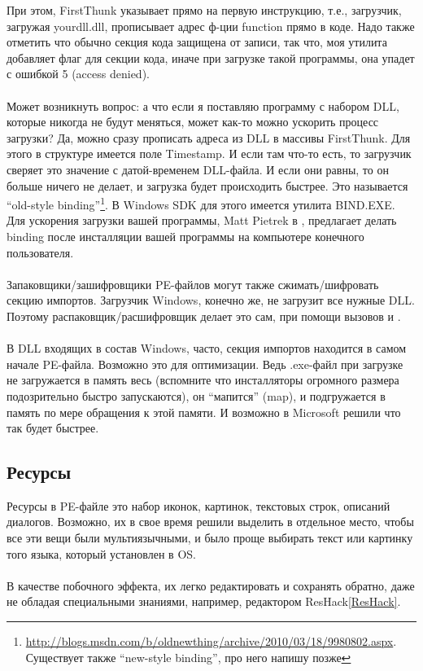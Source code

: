 При этом, FirstThunk указывает прямо на первую инструкцию, т.е., загрузчик, загружая yourdll.dll, прописывает адрес
ф-ции function прямо в коде. Надо также отметить что обычно секция кода защищена от записи, так что, моя утилита
добавляет флаг  для секции кода, иначе при загрузке такой программы, она упадет с
ошибкой 5 (access denied). \\
\\
Может возникнуть вопрос: а что если я поставляю программу с набором DLL, которые никогда не будут меняться,
может как-то можно ускорить процесс загрузки? Да, можно сразу прописать адреса из DLL в массивы FirstThunk.
Для этого в структуре  имеется поле Timestamp. И если там что-то есть, то загрузчик
сверяет это значение с датой-временем DLL-файла. И если они равны, то он больше ничего не делает, и загрузка будет
происходить быстрее. 
Это называется ``old-style binding''\footnote{\url{http://blogs.msdn.com/b/oldnewthing/archive/2010/03/18/9980802.aspx}. Существует также ``new-style binding'', про него напишу позже}.
В Windows SDK для этого имеется утилита BIND.EXE.
Для ускорения загрузки вашей программы, Matt Pietrek в \cite{Pietrek1}, предлагает делать binding после инсталляции
вашей программы на компьютере конечного пользователя. \\
\\
Запаковщики/зашифровщики PE-файлов могут также сжимать/шифровать секцию импортов. Загрузчик Windows,
конечно же, не загрузит все нужные DLL. Поэтому распаковщик/расшифровщик делает это сам, при помощи
вызовов  и . \\
\\
В DLL входящих в состав Windows, часто, секция импортов находится в самом начале PE-файла.
Возможно это для оптимизации.
Ведь .exe-файл при загрузке не загружается в память весь (вспомните что инсталляторы огромного размера подозрительно
быстро запускаются), он ``мапится'' (map), и подгружается в память по мере
обращения к этой памяти. И возможно в Microsoft решили что так будет быстрее.

\subsection{Ресурсы}

Ресурсы в PE-файле это набор иконок, картинок, текстовых строк, описаний диалогов.
Возможно, их в свое время решили выделить в отдельное место, чтобы все эти вещи были мультиязычными,
и было проще выбирать текст или картинку того языка, который установлен в \ac{OS}. \\
\\
В качестве побочного эффекта, их легко редактировать и сохранять обратно, даже не обладая специальными знаниями,
например, редактором ResHack\ref{ResHack}.

